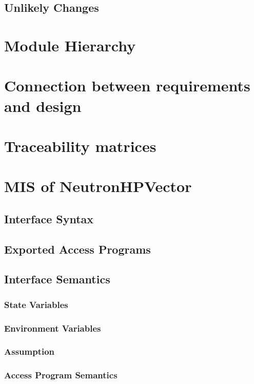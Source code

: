 \documentclass[12pt]{article}
\begin{document}
\subsection{Unlikely Changes} %

\section{Module Hierarchy}%

\section{Connection between requirements and design}%

\section{Traceability matrices}%




\section{MIS of NeutronHPVector}

\subsection{Interface Syntax}%

\subsection{Exported Access Programs}%

\subsection{Interface Semantics}

\subsubsection{State Variables}%

\subsubsection{Environment Variables}%

\subsubsection{Assumption}%

\subsubsection{Access Program Semantics}%
\end{document}
